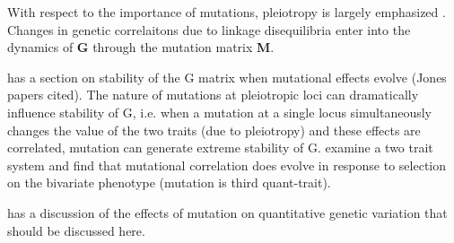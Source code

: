 \documentclass[9pt,twocolumn,twoside]{gsajnl}
\newcommand{\G}{\textbf{G }}
\begin{document}
With respect to the importance of mutations, pleiotropy is largely emphasized \cite{reeve2000predicting,Steppan2002,Arnold2008}. Changes in genetic correlaitons due to linkage disequilibria enter into the dynamics of \G through the mutation matrix \textbf{M}. 
\cite{Phillips2001}
\cite{lande1979quantitative} 

\cite{Arnold2008} has a section on stability of the G matrix when mutational effects evolve (Jones papers cited). 
\cite{Jones2003} The nature of mutations at pleiotropic loci can dramatically influence stability of G, i.e. when a mutation at a single locus simultaneously changes the value of the two traits (due to pleiotropy) and these effects are correlated, mutation can generate extreme stability of G. 
\cite{Jones2007} examine a two trait system and find that mutational correlation does evolve in response to selection on the bivariate phenotype (mutation is third quant-trait).

\cite{Johnson2005} has a discussion of the effects of mutation on quantitative genetic variation that should be discussed here. 


\end{document}
